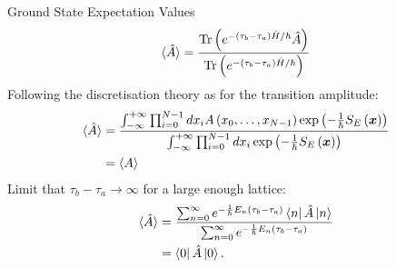 \documentclass{beamer}
\begin{document}
\begin{frame}[t,allowframebreaks]{Ground State Expectation Values}
    \begin{equation*}
            \braket{\hat{A}} = \frac{\text{Tr}\left(e^{-\left(\tau_b-\tau_a\right)\hat{H}/\hbar}\hat{A}\right)}{\text{Tr}\left(e^{-\left(\tau_b-\tau_a\right)\hat{H}/\hbar}\right)}
        \end{equation*}
         Following the discretisation theory as for the transition amplitude\cite{creutz_freedman_1981}:
        \begin{align*}
            \label{eq:SpecialEXP2}
            \braket{\hat{A}} & = \frac{\int^{+\infty}_{-\infty}\prod_{i=0}^{N-1}dx_i A\left(x_0,\dots,x_{N-1}\right)\exp{\left(-\frac{1}{\hbar}S_{E}\left(\bm{x}\right)\right)}}{\int^{+\infty}_{-\infty}\prod_{i=0}^{N-1}dx_i \exp{\left(-\frac{1}{\hbar}S_{E}\left(\bm{x}\right)\right)}}\\
            & = \langle A \rangle
        \end{align*}
        Limit that $\tau_b - \tau_a \rightarrow \infty$ for a large enough lattice: 
        \begin{align*}
            \braket{\hat{A}} & = \frac{\sum_{n=0}^{\infty}e^{-\frac{1}{\hbar}E_n\left(\tau_b-\tau_a\right)}\bra{n}\hat{A}\ket{n}}{\sum_{n=0}^{\infty}e^{-\frac{1}{\hbar}E_n\left(\tau_b-\tau_a\right)}} \\
            & = \bra{0}\hat{A}\ket{0}.
        \end{align*}
\end{frame}
\end{document}
